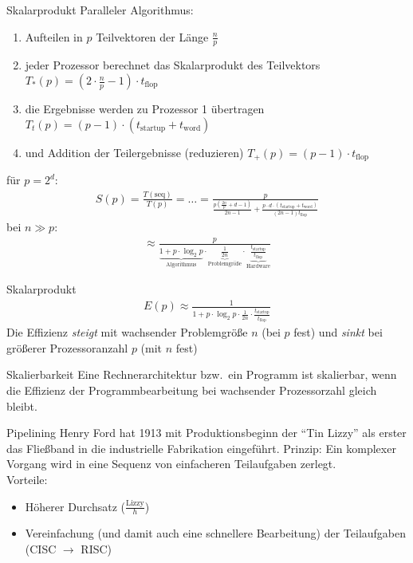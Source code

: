 \begin{example}[Speedup]{Skalarprodukt}
    Paralleler Algorithmus:
    \begin{enumerate}
        \item Aufteilen in $p$ Teilvektoren der Länge $\frac{n}{p}$
        \item jeder Prozessor berechnet das Skalarprodukt des Teilvektors $T_* (p) = \left(2 \cdot \frac{n}{p} - 1\right) \cdot t_\text{flop}$
        \item die Ergebnisse werden zu Prozessor 1 übertragen $T_t (p) = (p - 1) \cdot (t_\text{startup} + t_\text{word})$
        \item und Addition der Teilergebnisse (reduzieren) $T_+ (p) = (p - 1) \cdot t_\text{flop}$
    \end{enumerate}
    für $p=2^d$:
    \begin{align*}
        S(p) = \frac{T(\text{seq})}{T(p)} = \ldots =
        \frac{p}{\frac{p(\frac{2n}{p} + d-1)}{2n-1} + \frac{p\cdot d\cdot (t_\text{startup} + t_\text{word})}{(2n - 1)t_\text{flop}}}
    \end{align*}
    bei $n\gg p$:
    \begin{align*}
        \approx\frac{p}{
            \underbrace{1 + p\cdot \log_2 p}_{\text{Algorithmus}} \cdot
            \underbrace{\frac{1}{2n}}_{\text{Problemgröße}} \cdot
            \underbrace{\frac{t_\text{startup}}{t_\text{flop}}}_{\text{Hardware}}}
    \end{align*}
\end{example}

\begin{example}[Effizienz]{Skalarprodukt}
    \begin{align*}
        E(p)\approx\frac{1}{1 + p\cdot\log_2 p\cdot \frac{1}{2n} \cdot \frac{t_\text{startup}}{t_\text{flop}}}
    \end{align*}
    Die Effizienz \emph{steigt} mit wachsender Problemgröße $n$ (bei $p$ fest) und
    \emph{sinkt} bei größerer Prozessoranzahl $p$ (mit $n$ fest)
\end{example}

\begin{defi}{Skalierbarkeit}
    Eine Rechnerarchitektur bzw.\ ein Programm ist skalierbar,
    wenn die Effizienz der Programmbearbeitung bei wachsender Prozessorzahl gleich bleibt.
\end{defi}

\begin{defi}{Pipelining}
    Henry Ford hat 1913 mit Produktionsbeginn der \enquote{Tin Lizzy} als erster das Fließband in die industrielle Fabrikation eingeführt.
    Prinzip: Ein komplexer Vorgang wird in eine Sequenz von einfacheren Teilaufgaben zerlegt. \\
    Vorteile:
    \begin{itemize}
        \item Höherer Durchsatz ($\frac{\text{Lizzy}}{h}$)
        \item Vereinfachung (und damit auch eine schnellere Bearbeitung) der Teilaufgaben (CISC $\to$ RISC)
    \end{itemize}
\end{defi}